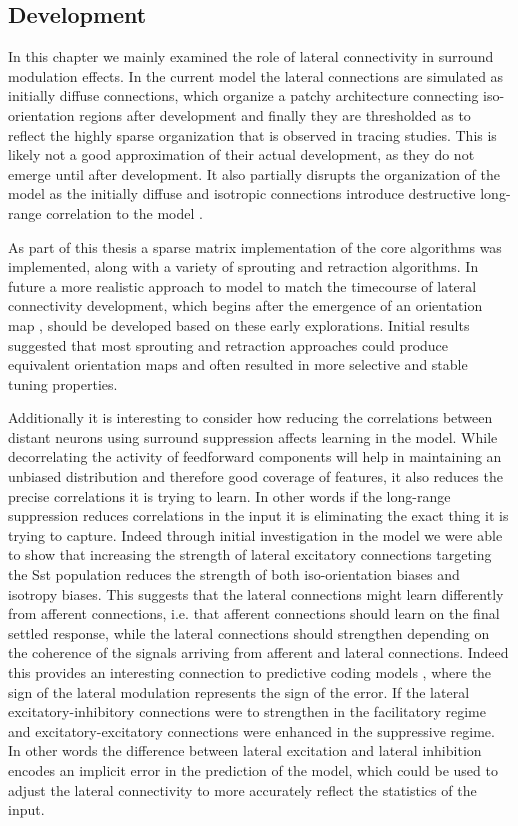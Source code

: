 \subsection{Development}

In this chapter we mainly examined the role of lateral connectivity in
surround modulation effects. In the current model the lateral
connections are simulated as initially diffuse connections, which
organize a patchy architecture connecting iso-orientation regions
after development and finally they are thresholded as to reflect the
highly sparse organization that is observed in tracing studies. This
is likely not a good approximation of their actual development, as
they do not emerge until after development. It also partially disrupts
the organization of the model as the initially diffuse and isotropic
connections introduce destructive long-range correlation to the model
\citep{Miikkulainen2005}.

As part of this thesis a sparse matrix implementation of the core
algorithms was implemented, along with a variety of sprouting and
retraction algorithms. In future a more realistic approach to model to
match the timecourse of lateral connectivity development, which begins
after the emergence of an orientation map \citep{Ruthazer1996}, should
be developed based on these early explorations. Initial results
suggested that most sprouting and retraction approaches could produce
equivalent orientation maps and often resulted in more selective and
stable tuning properties.

Additionally it is interesting to consider how reducing the
correlations between distant neurons using surround suppression
affects learning in the model. While decorrelating the activity of
feedforward components will help in maintaining an unbiased
distribution and therefore good coverage of features, it also reduces
the precise correlations it is trying to learn. In other words if the
long-range suppression reduces correlations in the input it is
eliminating the exact thing it is trying to capture. Indeed through
initial investigation in the model we were able to show that
increasing the strength of lateral excitatory connections targeting
the Sst population reduces the strength of both iso-orientation biases
and isotropy biases. This suggests that the lateral connections might
learn differently from afferent connections, i.e. that afferent
connections should learn on the final settled response, while the
lateral connections should strengthen depending on the coherence of
the signals arriving from afferent and lateral connections. Indeed
this provides an interesting connection to predictive coding models
\citep{Rao1999}, where the sign of the lateral modulation represents
the sign of the error. If the lateral excitatory-inhibitory
connections were to strengthen in the facilitatory regime and
excitatory-excitatory connections were enhanced in the suppressive
regime. In other words the difference between lateral excitation and
lateral inhibition encodes an implicit error in the prediction of the
model, which could be used to adjust the lateral connectivity to more
accurately reflect the statistics of the input.

